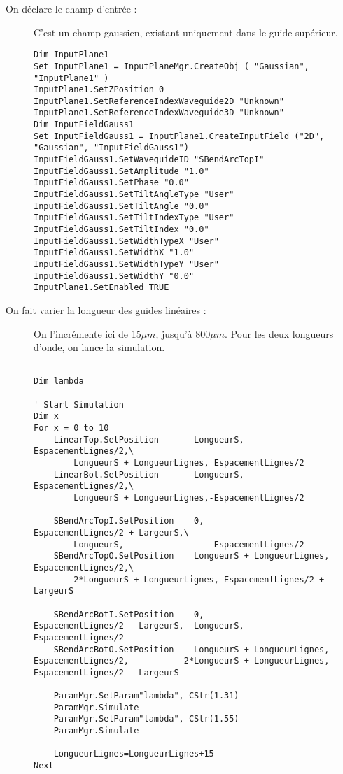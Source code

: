 \begin{description}
    \item[On déclare le champ d'entrée :] C'est un champ gaussien, existant uniquement dans le guide supérieur.
\begin{lstlisting}[style=Common]
Dim InputPlane1
Set InputPlane1 = InputPlaneMgr.CreateObj ( "Gaussian", "InputPlane1" )
InputPlane1.SetZPosition 0
InputPlane1.SetReferenceIndexWaveguide2D "Unknown"
InputPlane1.SetReferenceIndexWaveguide3D "Unknown"
Dim InputFieldGauss1
Set InputFieldGauss1 = InputPlane1.CreateInputField ("2D", "Gaussian", "InputFieldGauss1")
InputFieldGauss1.SetWaveguideID "SBendArcTopI"
InputFieldGauss1.SetAmplitude "1.0"
InputFieldGauss1.SetPhase "0.0"
InputFieldGauss1.SetTiltAngleType "User"
InputFieldGauss1.SetTiltAngle "0.0"
InputFieldGauss1.SetTiltIndexType "User"
InputFieldGauss1.SetTiltIndex "0.0"
InputFieldGauss1.SetWidthTypeX "User"
InputFieldGauss1.SetWidthX "1.0"
InputFieldGauss1.SetWidthTypeY "User"
InputFieldGauss1.SetWidthY "0.0"
InputPlane1.SetEnabled TRUE

\end{lstlisting}

    \item[On fait varier la longueur des guides linéaires :] On l'incrémente ici de 15$\mu m$, jusqu'à 800$\mu m$. Pour les deux longueurs d'onde, on lance la simulation.
\begin{lstlisting}[style=Common]

Dim lambda

' Start Simulation
Dim x
For x = 0 to 10
    LinearTop.SetPosition       LongueurS,                  EspacementLignes/2,\
        LongueurS + LongueurLignes, EspacementLignes/2
    LinearBot.SetPosition       LongueurS,                 -EspacementLignes/2,\
        LongueurS + LongueurLignes,-EspacementLignes/2

    SBendArcTopI.SetPosition    0,                          EspacementLignes/2 + LargeurS,\
        LongueurS,                  EspacementLignes/2
    SBendArcTopO.SetPosition    LongueurS + LongueurLignes, EspacementLignes/2,\
        2*LongueurS + LongueurLignes, EspacementLignes/2 + LargeurS

    SBendArcBotI.SetPosition    0,                         -EspacementLignes/2 - LargeurS,  LongueurS,                 -EspacementLignes/2
    SBendArcBotO.SetPosition    LongueurS + LongueurLignes,-EspacementLignes/2,           2*LongueurS + LongueurLignes,-EspacementLignes/2 - LargeurS

    ParamMgr.SetParam"lambda", CStr(1.31)
    ParamMgr.Simulate
    ParamMgr.SetParam"lambda", CStr(1.55)
    ParamMgr.Simulate

    LongueurLignes=LongueurLignes+15
Next

\end{lstlisting}
\end{description}
